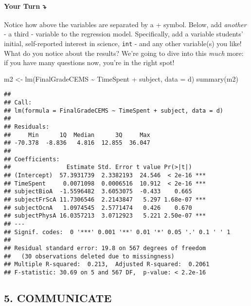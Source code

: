 \documentclass[
]{article}
\newenvironment{Shaded}{\begin{snugshade}}{\end{snugshade}}
\newcommand{\AttributeTok}[1]{\textcolor[rgb]{0.77,0.63,0.00}{#1}}
\newcommand{\FunctionTok}[1]{\textcolor[rgb]{0.00,0.00,0.00}{#1}}
\newcommand{\NormalTok}[1]{#1}
\newcommand{\OtherTok}[1]{\textcolor[rgb]{0.56,0.35,0.01}{#1}}
\newcommand{\SpecialCharTok}[1]{\textcolor[rgb]{0.00,0.00,0.00}{#1}}
\begin{document}
\hypertarget{your-turn-6}{%
\paragraph{\texorpdfstring{{\textbf{Your Turn}}
\textbf{⤵}}{Your Turn ⤵}}\label{your-turn-6}}

Notice how above the variables are separated by a + symbol. Below, add
\emph{another} - a third - variable to the regression model.
Specifically, add a variable students' initial, self-reported interest
in science, \texttt{int} - and any other variable(s) you like! What do
you notice about the results? We're going to dive into this \emph{much}
more: if you have many questions now, you're in the right spot!

\begin{Shaded}
\begin{Highlighting}[]
\NormalTok{m2 }\OtherTok{\textless{}{-}} \FunctionTok{lm}\NormalTok{(FinalGradeCEMS }\SpecialCharTok{\textasciitilde{}}\NormalTok{ TimeSpent }\SpecialCharTok{+}\NormalTok{ subject, }\AttributeTok{data =}\NormalTok{ d)}
\FunctionTok{summary}\NormalTok{(m2)}
\end{Highlighting}
\end{Shaded}

\begin{verbatim}
## 
## Call:
## lm(formula = FinalGradeCEMS ~ TimeSpent + subject, data = d)
## 
## Residuals:
##     Min      1Q  Median      3Q     Max 
## -70.378  -8.836   4.816  12.855  36.047 
## 
## Coefficients:
##                Estimate Std. Error t value Pr(>|t|)    
## (Intercept)  57.3931739  2.3382193  24.546  < 2e-16 ***
## TimeSpent     0.0071098  0.0006516  10.912  < 2e-16 ***
## subjectBioA  -1.5596482  3.6053075  -0.433    0.665    
## subjectFrScA 11.7306546  2.2143847   5.297 1.68e-07 ***
## subjectOcnA   1.0974545  2.5771474   0.426    0.670    
## subjectPhysA 16.0357213  3.0712923   5.221 2.50e-07 ***
## ---
## Signif. codes:  0 '***' 0.001 '**' 0.01 '*' 0.05 '.' 0.1 ' ' 1
## 
## Residual standard error: 19.8 on 567 degrees of freedom
##   (30 observations deleted due to missingness)
## Multiple R-squared:  0.213,  Adjusted R-squared:  0.2061 
## F-statistic: 30.69 on 5 and 567 DF,  p-value: < 2.2e-16
\end{verbatim}

\hypertarget{communicate}{%
\subsection{5. COMMUNICATE}\label{communicate}}
\end{document}
